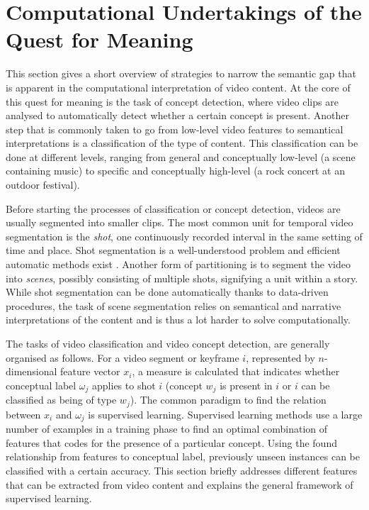 
\section{Computational Undertakings of the Quest for Meaning}

This section gives a short overview of strategies to narrow the semantic gap that is apparent in the computational interpretation of video content. At the core of this quest for meaning is the task of concept detection\cite{Snoek:2009dq}, where video clips are analysed to automatically detect whether a certain concept is present. Another step that is commonly taken to go from low-level video features to semantical interpretations is a classification of the type of content. This classification can be done at different levels, ranging from general and conceptually low-level (a scene containing music) to specific and conceptually high-level (a rock concert at an outdoor festival)\cite{Wang:2000vf}.

Before starting the processes of classification or concept detection, videos are usually segmented into smaller clips. The most common unit for temporal video segmentation is the \emph{shot}, one continuously recorded interval in the same setting of time and place. Shot segmentation is a well-understood problem and efficient automatic methods exist \cite{springerlink:10.1007/BF01210504, Yuan:hu}. Another form of partitioning is to segment the video into \emph{scenes}, possibly consisting of multiple shots, signifying a unit within a story\cite{Wang:2000vf}. While shot segmentation can be done automatically thanks to data-driven procedures, the task of scene segmentation relies on semantical and narrative interpretations of the content and is thus a lot harder to solve computationally.

The tasks of video classification and video concept detection, are generally organised as follows. For a video segment or keyframe $i$, represented by $n$-dimensional feature vector $x_i$, a measure is calculated that indicates whether conceptual label $\omega_j$ applies to shot $i$ (concept $w_j$ is present in $i$ or  $i$ can be classified as being of type $w_j$). The common paradigm to find the relation between $x_i$ and $\omega_j$ is supervised learning. Supervised learning methods use a large number of examples in a training phase to find an optimal combination of features that codes for the presence of a particular concept. Using the found relationship from features to conceptual label, previously unseen instances can be classified with a certain accuracy. This section briefly addresses different features that can be extracted from video content and explains the general framework of supervised learning.


